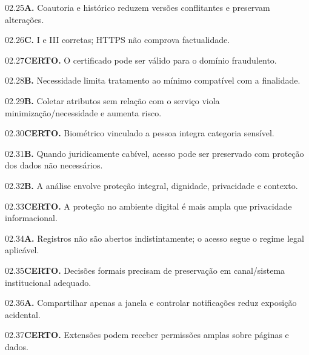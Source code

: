 \begin{solucao}{02.25}\textbf{A.} Coautoria e histórico reduzem versões conflitantes e preservam alterações.\end{solucao}
\begin{solucao}{02.26}\textbf{C.} I e III corretas; HTTPS não comprova factualidade.\end{solucao}
\begin{solucao}{02.27}\textbf{CERTO.} O certificado pode ser válido para o domínio fraudulento.\end{solucao}
\begin{solucao}{02.28}\textbf{B.} Necessidade limita tratamento ao mínimo compatível com a finalidade.\end{solucao}
\begin{solucao}{02.29}\textbf{B.} Coletar atributos sem relação com o serviço viola minimização/necessidade e aumenta risco.\end{solucao}
\begin{solucao}{02.30}\textbf{CERTO.} Biométrico vinculado a pessoa integra categoria sensível.\end{solucao}
\begin{solucao}{02.31}\textbf{B.} Quando juridicamente cabível, acesso pode ser preservado com proteção dos dados não necessários.\end{solucao}
\begin{solucao}{02.32}\textbf{B.} A análise envolve proteção integral, dignidade, privacidade e contexto.\end{solucao}
\begin{solucao}{02.33}\textbf{CERTO.} A proteção no ambiente digital é mais ampla que privacidade informacional.\end{solucao}
\begin{solucao}{02.34}\textbf{A.} Registros não são abertos indistintamente; o acesso segue o regime legal aplicável.\end{solucao}
\begin{solucao}{02.35}\textbf{CERTO.} Decisões formais precisam de preservação em canal/sistema institucional adequado.\end{solucao}
\begin{solucao}{02.36}\textbf{A.} Compartilhar apenas a janela e controlar notificações reduz exposição acidental.\end{solucao}
\begin{solucao}{02.37}\textbf{CERTO.} Extensões podem receber permissões amplas sobre páginas e dados.\end{solucao}
